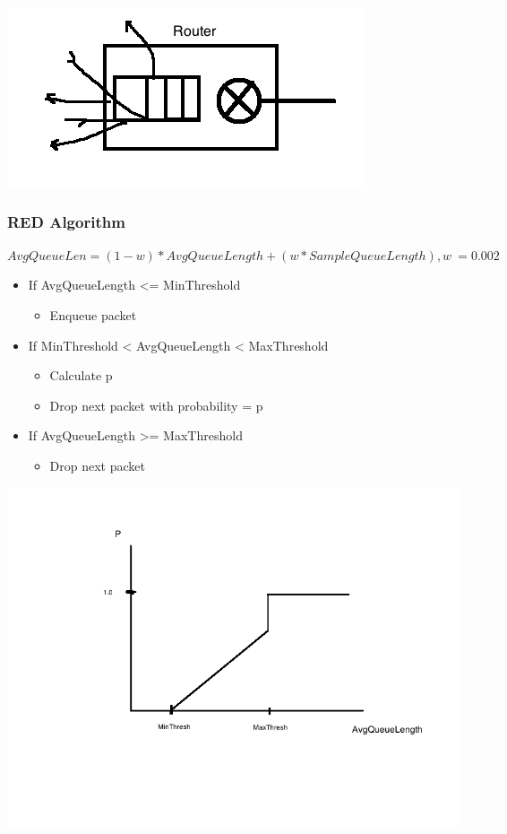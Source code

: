 \documentclass[11pt]{article}
\begin{document}
\includegraphics[width=.9\linewidth]{diagrams/router_congestion.png}

\subsubsection{RED Algorithm}
\label{sec:orgheadline168}

\(AvgQueueLen = (1 - w) * AvgQueueLength + (w * SampleQueueLength),
w~=0.002\) \\

\begin{itemize}
\item If AvgQueueLength <= MinThreshold
\begin{itemize}
\item Enqueue packet
\end{itemize}
\item If MinThreshold < AvgQueueLength < MaxThreshold
\begin{itemize}
\item Calculate p
\item Drop next packet with probability = p
\end{itemize}
\item If AvgQueueLength >= MaxThreshold
\begin{itemize}
\item Drop next packet
\end{itemize}
\end{itemize}

\includegraphics[width=.9\linewidth]{diagrams/RED.png}
\end{document}
